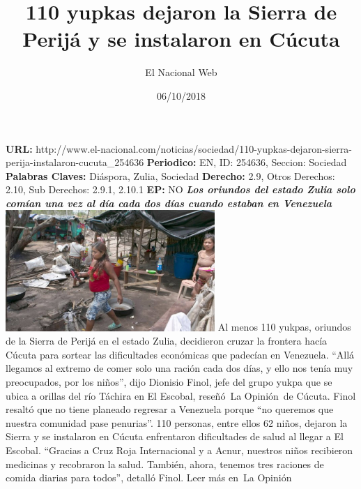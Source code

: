 \documentclass{article}%
\title{\textbf{110 yupkas dejaron la Sierra de Perijá y se instalaron en Cúcuta}}%
\author{El Nacional Web}%
\date{06/10/2018}%
\begin{document}
%
\normalsize%
\maketitle%
\textbf{URL: }%
http://www.el{-}nacional.com/noticias/sociedad/110{-}yupkas{-}dejaron{-}sierra{-}perija{-}instalaron{-}cucuta\_254636\newline%
%
\textbf{Periodico: }%
EN, %
ID: %
254636, %
Seccion: %
Sociedad\newline%
%
\textbf{Palabras Claves: }%
Diáspora, Zulia, Sociedad\newline%
%
\textbf{Derecho: }%
2.9, %
Otros Derechos: %
2.10, %
Sub Derechos: %
2.9.1, 2.10.1\newline%
%
\textbf{EP: }%
NO\newline%
\newline%
%
\textbf{\textit{Los oriundos del estado Zulia solo comían una vez al día cada dos días cuando estaban en Venezuela~}}%
\newline%
\newline%
%
\includegraphics[width=300px]{61.jpg}%
\newline%
%
Al menos 110 yukpas, oriundos de la Sierra de Perijá en el estado Zulia, decidieron cruzar la frontera hacía Cúcuta para sortear las dificultades económicas que padecían en Venezuela.%
\newline%
%
“Allá llegamos al extremo de comer solo una ración cada dos días, y ello nos tenía muy preocupados, por los niños”, dijo Dionisio Finol, jefe del grupo yukpa que se ubica a orillas del río Táchira en El Escobal, reseñó~La Opinión~de Cúcuta.%
\newline%
%
Finol resaltó que no tiene planeado regresar a Venezuela porque “no queremos que nuestra comunidad pase penurias”.%
\newline%
%
110 personas, entre ellos 62 niños, dejaron la Sierra y se instalaron en Cúcuta enfrentaron dificultades de salud al llegar a El Escobal.%
\newline%
%
“Gracias a Cruz Roja Internacional y a Acnur, nuestros niños recibieron medicinas y recobraron la salud. También, ahora, tenemos tres raciones de comida diarias para todos”, detalló Finol.%
\newline%
%
Leer más en~La Opinión%
\newline%
%
\end{document}
